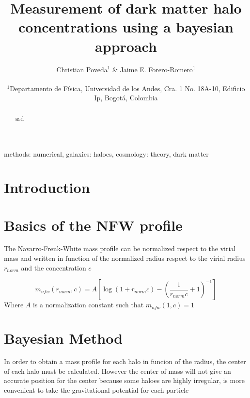 \documentclass[useAMS,usenatbib]{mn2e}
\begin{document}
\title[Bayesian halo concentration]{Measurement of dark matter halo concentrations using a bayesian approach}
\author[Poveda \& Forero-Romero]{
\parbox[t]{\textwidth}{\raggedright
  Christian Poveda$^{1}$ \&
  Jaime E. Forero-Romero$^{1}$
}
\vspace*{6pt}\\
$^{1}$Departamento de F\'{i}sica, Universidad de los Andes, Cra. 1
No. 18A-10, Edificio Ip, Bogot\'a, Colombia\\
}
\maketitle

\begin{abstract}
asd
\end{abstract}
\begin{keywords}
methods: numerical, galaxies: haloes, cosmology: theory, dark
matter
\end{keywords}


\section{Introduction}
\label{sec:introduction}


\citep{NFW}


\section{Basics of the NFW profile}
\label{sec:basics}

The Navarro-Frenk-White mass profile can be normalized respect to
the virial mass and written in function of the normalized radius respect
to the virial radius $r_{norm}$ and the concentration $c$ 

\[
m_{nfw}\left(r_{norm},c\right)=A\left[\log\left(1+r_{norm}c\right)-\left(\frac{1}{r_{norm}c}+1\right)^{-1}\right]
\]
Where $A$ is a normalization constant such that $m_{nfw}\left(1,c\right)=1$





\section{Bayesian Method}
\label{sec:method}

In order to obtain a mass profile for each halo in funcion of the
radius, the center of each halo must be calculated. However the center
of mass will not give an accurate position for the center because
some haloes are highly irregular, is more convenient to take the gravitational
potential for each particle
\end{document}
